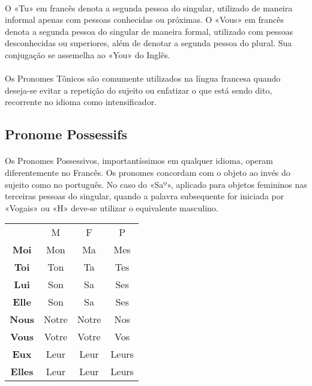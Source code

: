 \documentclass{article}
\begin{document}
    \paragraph{}O «Tu» em francês denota a segunda pessoa do singular, utilizado de maneira informal apenas com pessoas conhecidas ou próximas. O «Vous» em francês denota a segunda pessoa do singular de maneira formal, utilizado com pessoas desconhecidas ou superiores, além de denotar a segunda pessoa do plural. Sua conjugação se assemelha ao «You» do Inglês.
    
    \paragraph{}Os Pronomes Tônicos são comumente utilizados na língua francesa quando deseja-se evitar a repetição do sujeito ou enfatizar o que está sendo dito, recorrente no idioma como intensificador.
    
    \subsection{Pronome Possessifs}
        \paragraph{}Os Pronomes Possessivos, importantíssimos em qualquer idioma, operam diferentemente no Francês. Os pronomes concordam com o objeto ao invés do sujeito como no português. No caso do «Saº», aplicado para objetos femininos nas terceiras pessoas do singular, quando a palavra subsequente for iniciada por «Vogais» ou «H» deve-se utilizar o equivalente masculino.
        
            \begin{center}
                \begin{tabular}{c c c c}
                                   & M     & F     & P\\[1ex]
                    \textbf{Moi}   & Mon   & Ma    & Mes\\ 
                    \textbf{Toi}   & Ton   & Ta    & Tes\\  
                    \textbf{Lui}   & Son   & Sa    & Ses\\
                    \textbf{Elle}  & Son   & Sa    & Ses\\
                    \textbf{Nous}  & Notre & Notre & Nos\\
                    \textbf{Vous}  & Votre & Votre & Vos\\
                    \textbf{Eux}   & Leur  & Leur  & Leurs\\
                    \textbf{Elles} & Leur  & Leur  & Leurs\\
                \end{tabular}
            \end{center}
        
\end{document}
